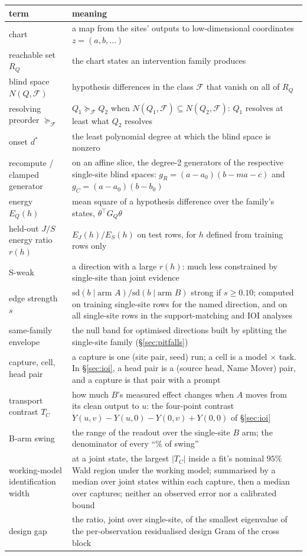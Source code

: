 \begin{center}\small
\begin{tabularx}{\textwidth}{@{}l>{\raggedright\arraybackslash}X@{}}
\toprule
term & meaning \\
\midrule
chart & a map from the sites' outputs to low-dimensional coordinates $z=(a,b,\dots)$ \\
reachable set $R_Q$ & the chart states an intervention family produces \\
blind space $N(Q,\mathcal F)$ & hypothesis differences in the class $\mathcal F$ that vanish on all of $R_Q$ \\
resolving preorder $\succeq_{\mathcal F}$ & $Q_1\succeq_{\mathcal F}Q_2$ when $N(Q_1,\mathcal F)\subseteq N(Q_2,\mathcal F)$: $Q_1$ resolves at least what $Q_2$ resolves \\
onset $d^*$ & the least polynomial degree at which the blind space is nonzero \\
recompute / clamped generator & on an affine slice, the degree-2 generators of the respective single-site blind spaces: $g_R=(a-a_0)(b-ma-c)$ and $g_C=(a-a_0)(b-b_0)$ \\
energy $E_Q(h)$ & mean square of a hypothesis difference over the family's states, $\theta^\top G_Q\theta$ \\
held-out $J/S$ energy ratio $r(h)$ & $E_J(h)/E_S(h)$ on test rows, for $h$ defined from training rows only \\
S-weak & a direction with a large $r(h)$: much less constrained by single-site than joint evidence \\
edge strength $s$ & $\mathrm{sd}(b\mid\text{arm }A)/\mathrm{sd}(b\mid\text{arm }B)$ strong if $s\ge0.10$; computed on training single-site rows for the named direction, and on all single-site rows in the support-matching and IOI analyses \\
same-family envelope & the null band for optimised directions built by splitting the single-site family (\S\ref{sec:pitfalls}) \\
capture, cell, head pair & a capture is one (site pair, seed) run; a cell is a model $\times$ task. In \S\ref{sec:ioi}, a head pair is a (source head, Name Mover) pair, and a capture is that pair with a prompt \\
transport contrast $T_C$ & how much $B$'s measured effect changes when $A$ moves from its clean output to $u$: the four-point contrast $Y(u,v)-Y(u,0)-Y(0,v)+Y(0,0)$ of \S\ref{sec:ioi} \\
B-arm swing & the range of the readout over the single-site $B$ arm; the denominator of every ``\% of swing'' \\
working-model identification width & at a joint state, the largest $|T_C|$ inside a fit's nominal $95\%$ Wald region under the working model; summarised by a median over joint states within each capture, then a median over captures; neither an observed error nor a calibrated bound \\
design gap & the ratio, joint over single-site, of the smallest eigenvalue of the per-observation residualised design Gram of the cross block \\
\bottomrule
\end{tabularx}
\end{center}


